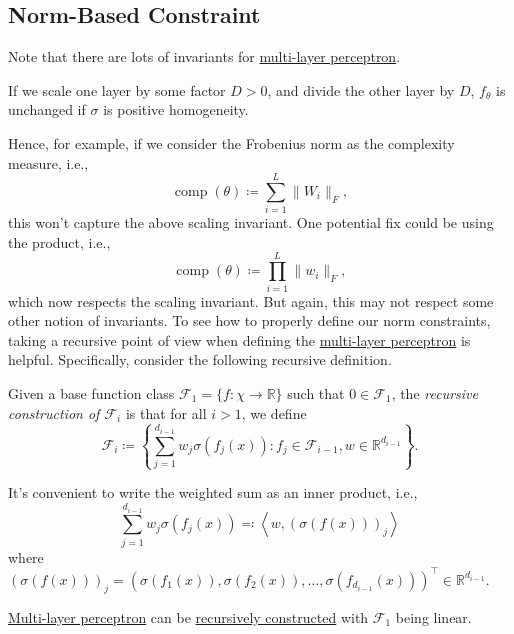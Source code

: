\subsection{Norm-Based Constraint}
Note that there are lots of invariants for \hyperref[def:MLP]{multi-layer perceptron}.

\begin{eg}[Scaling]
	If we scale one layer by some factor \(D > 0\), and divide the other layer by \(D\), \(f_\theta \) is unchanged if \(\sigma \) is positive homogeneity.
\end{eg}

Hence, for example, if we consider the Frobenius norm as the complexity measure, i.e.,
\[
	\operatorname{comp}(\theta ) \coloneqq \sum_{i=1}^{L} \lVert W_i \rVert _F,
\]
this won't capture the above scaling invariant. One potential fix could be using the product, i.e.,
\[
	\operatorname{comp}(\theta ) \coloneqq \prod_{i=1}^{L} \lVert w_i \rVert _F,
\]
which now respects the scaling invariant. But again, this may not respect some other notion of invariants. To see how to properly define our norm constraints, taking a recursive point of view when defining the \hyperref[def:MLP]{multi-layer perceptron} is helpful. Specifically, consider the following recursive definition.

\begin{definition}\label{def:recursive}
	Given a base function class \(\mathscr{F} _1 = \{ f \colon \chi \to \mathbb{R} \} \) such that \(0 \in \mathscr{F} _1\), the \emph{recursive construction of \(\mathscr{F} _i\)} is that for all \(i > 1\), we define
	\[
		\mathscr{F} _i \coloneqq \left\{ \sum_{j=1}^{d_{i-1} } w_j \sigma (f_j(x)) \colon f_j \in \mathscr{F} _{i-1}, w \in \mathbb{R} ^{d_{i-1}} \right\}.
	\]
\end{definition}

\begin{note}
	It's convenient to write the weighted sum as an inner product, i.e.,
	\[
		\sum_{j=1}^{d_{i-1}} w_j \sigma (f_j(x)) \eqqcolon \left\langle w, (\sigma (f(x)))_j \right\rangle
	\]
	where \((\sigma (f(x)))_j = (\sigma (f_1(x)), \sigma (f_2(x)), \dots , \sigma (f_{d_{i-1}}(x)))^{\top} \in \mathbb{R} ^{d_{i-1}}\).
\end{note}

\begin{eg}
	\hyperref[def:MLP]{Multi-layer perceptron} can be \hyperref[def:recursive]{recursively constructed} with \(\mathscr{F} _1\) being linear.
\end{eg}

